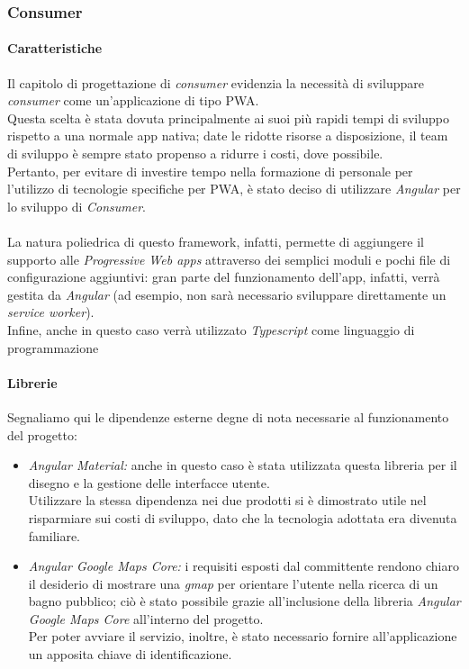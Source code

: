 \documentclass[12pt]{article}
\begin{document}
\subsubsection{Consumer}
\paragraph{Caratteristiche}
Il capitolo di progettazione di \textit{consumer} evidenzia la necessità di sviluppare \textit{consumer} come un'applicazione di tipo PWA.\\
Questa scelta è stata dovuta principalmente ai suoi più rapidi tempi di sviluppo rispetto a una normale app nativa; date le ridotte risorse a disposizione, il team di sviluppo è sempre stato propenso a ridurre i costi, dove possibile.\\
Pertanto, per evitare di investire tempo nella formazione di personale per l'utilizzo di tecnologie specifiche per PWA, è stato deciso di utilizzare \textit{Angular} per lo sviluppo di \textit{Consumer}.\\\\
La natura poliedrica di questo framework, infatti, permette di aggiungere il supporto alle \textit{Progressive Web apps} attraverso dei semplici moduli e pochi file di configurazione aggiuntivi: gran parte del funzionamento dell'app, infatti, verrà gestita da \textit{Angular} (ad esempio, non sarà necessario sviluppare direttamente un \textit{service worker}).\\
Infine, anche in questo caso verrà utilizzato \textit{Typescript} come linguaggio di programmazione
\paragraph{Librerie}

Segnaliamo qui le dipendenze esterne degne di nota necessarie al funzionamento del progetto:
\begin{itemize}
\item \textit{Angular Material:} anche in questo caso è stata utilizzata questa libreria per il disegno e la gestione delle interfacce utente.\\
Utilizzare la stessa dipendenza nei due prodotti si è dimostrato utile nel risparmiare sui costi di sviluppo, dato che la tecnologia adottata era divenuta familiare.
\item \textit{Angular Google Maps Core:} i requisiti esposti dal committente rendono chiaro il desiderio di mostrare una \textit{gmap} per orientare l'utente nella ricerca di un bagno pubblico; ciò è stato possibile grazie all'inclusione della libreria \textit{Angular Google Maps Core} all'interno del progetto.\\
Per poter avviare il servizio, inoltre, è stato necessario fornire all'applicazione un apposita chiave di identificazione.

\end{itemize}
\end{document}
